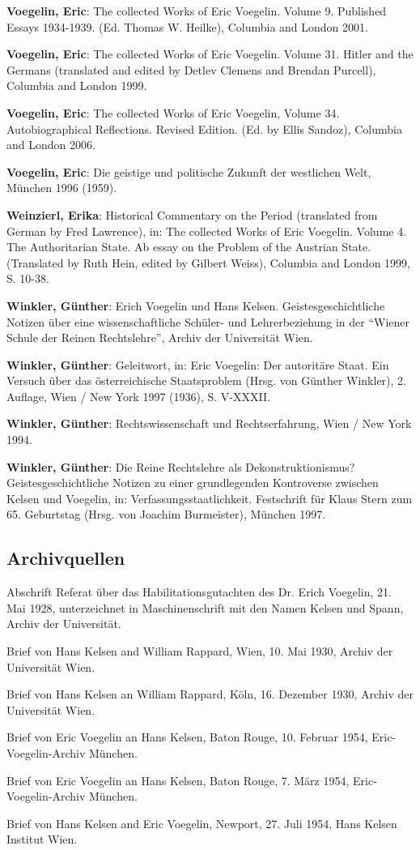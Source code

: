 \documentclass[12pt,a4paper,ngerman]{article}
\begin{document}
{\bf Voegelin, Eric}: The collected Works of Eric Voegelin. Volume 9.
Published Essays 1934-1939. (Ed. Thomas W. Heilke), Columbia and London 2001.

{\bf Voegelin, Eric}: The collected Works of Eric Voegelin. Volume 31.
Hitler and the Germans (translated and edited by Detlev Clemens and Brendan
Purcell), Columbia and London 1999.

{\bf Voegelin, Eric}: The collected Works of Eric Voegelin, Volume 34.
Autobiographical Reflections. Revised Edition. (Ed. by Ellis Sandoz),
Columbia and London 2006.

{\bf Voegelin, Eric}: Die geistige und politische
  Zukunft der westlichen Welt, München 1996 (1959).

{\bf Weinzierl, Erika}: Historical Commentary on the Period
(translated from German by Fred Lawrence), in: The collected Works
of Eric Voegelin. Volume 4. The Authoritarian State. Ab essay on
the Problem of the Austrian State. (Translated by Ruth Hein, edited
by Gilbert Weiss), Columbia and London 1999, S. 10-38.

{\bf Winkler, Günther}: Erich Voegelin und Hans Kelsen.
Geistesgeschichtliche Notizen über eine wissenschaftliche Schüler- und
Lehrerbeziehung in der "`Wiener Schule der Reinen Rechtslehre"',
Archiv der Universität Wien.

{\bf Winkler, Günther}: Geleitwort, in: Eric Voegelin: Der
autoritäre Staat. Ein Versuch über das österreichische Staatsproblem
(Hrsg. von Günther Winkler), 2.  Auflage, Wien / New York 1997
(1936), S. V-XXXII.

{\bf Winkler, Günther}: Rechtswissenschaft und Rechtserfahrung, Wien /
New York 1994.

{\bf Winkler, Günther}: Die Reine Rechtslehre als
Dekonstruktionismus? Geistesgeschichtliche Notizen zu einer
grundlegenden Kontroverse zwischen Kelsen und Voegelin, in:
Verfassungsstaatlichkeit. Festschrift für Klaus Stern zum 65.
Geburtstag (Hrsg. von Joachim Burmeister), München 1997.


\subsection{Archivquellen}

Abschrift Referat über das Habilitationsgutachten des Dr. Erich
Voegelin, 21. Mai 1928, unterzeichnet in Maschinenschrift mit den
Namen Kelsen und Spann, Archiv der Universität.

Brief von Hans Kelsen and William Rappard, Wien, 10. Mai 1930, Archiv
der Universität Wien.

Brief von Hans Kelsen an William Rappard, Köln, 16. Dezember 1930, Archiv
der Universität Wien.

Brief von Eric Voegelin an Hans Kelsen, Baton Rouge, 10. Februar 1954,
Eric-Voegelin-Archiv München.

Brief von Eric Voegelin an Hans Kelsen, Baton Rouge, 7. März 1954,
Eric-Voegelin-Archiv München.

Brief von Hans Kelsen and Eric Voegelin, Newport, 27. Juli 1954, Hans Kelsen
Institut Wien.
\end{document}
